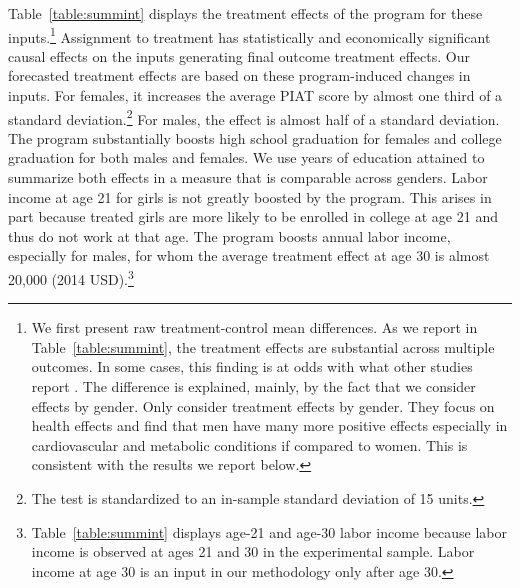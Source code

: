 Table~\ref{table:summint} displays the treatment effects of the program for these inputs.\footnote{We first present raw treatment-control mean differences. As we report in Table~\ref{table:summint}, the treatment effects are substantial across multiple outcomes. In some cases, this finding is at odds with what other studies report \citep{Ramey_etal_1985_Project-CARE_TiECSE,Clarke_Campbell_1998_ABC_Comparison_ECRQ,Campbell_Pungello_etal_2001_DP,Campbell_Ramey_etal_2002_ADS,Campbell_Wasik_etal_2008_ECRQ,Campbell_Conti_etal_2014_EarlyChildhoodInvestments}. The difference is explained, mainly, by the fact that we consider effects by gender.  Only \citet{Campbell_Conti_etal_2014_EarlyChildhoodInvestments} consider treatment effects by gender. They focus on health effects and find that men have many more positive effects especially in cardiovascular and metabolic conditions if compared to women. This is consistent with the results we report below.} Assignment to treatment has statistically and economically significant causal effects on the inputs generating final outcome treatment effects. Our forecasted treatment effects are based on these program-induced changes in inputs. For females, it increases the average PIAT score by almost one third of a standard deviation.\footnote{The test is standardized to an in-sample standard deviation of 15 units.} For males, the effect is almost half of a standard deviation. The program substantially boosts high school graduation for females and college graduation for both males and females. We use years of education attained to summarize both effects in a measure that is comparable across genders. Labor income at age 21 for girls is not greatly boosted by the program. This arises in part because treated girls are more likely to be enrolled in college at age 21 and thus do not work at that age. The program boosts annual labor income, especially for males, for whom the average treatment effect at age 30 is almost 20,000 (2014 USD).\footnote{Table~\ref{table:summint} displays age-21 and age-30 labor income because labor income is observed at ages 21 and 30 in the experimental sample. Labor income at age 30 is an input in our methodology only after age 30.}

